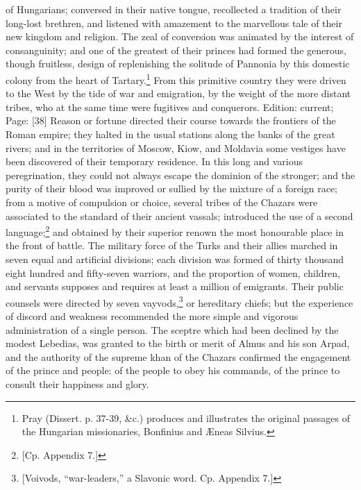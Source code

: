 of Hungarians; conversed in their native tongue, recollected a tradition of their long-lost brethren, and listened with amazement to the marvellous tale of their new kingdom and religion. The zeal of conversion was animated by the interest of consanguinity; and one of the greatest of their princes had formed the generous, though fruitless, design of replenishing the solitude of Pannonia by this domestic colony from the heart of Tartary.\footnote{Pray (Dissert. p. 37-39, \&c.) produces and illustrates the original passages of the Hungarian missionaries, Bonfinius and Æneas Silvius.} From this primitive country they were driven to the West by the tide of war and emigration, by the weight of the more distant tribes, who at the same time were fugitives and conquerors. Edition: current; Page: [38] Reason or fortune directed their course towards the frontiers of the Roman empire; they halted in the usual stations along the banks of the great rivers; and in the territories of Moscow, Kiow, and Moldavia some vestiges have been discovered of their temporary residence. In this long and various peregrination, they could not always escape the dominion of the stronger; and the purity of their blood was improved or sullied by the mixture of a foreign race; from a motive of compulsion or choice, several tribes of the Chazars were associated to the standard of their ancient vassals; introduced the use of a second language;\footnote{[Cp. Appendix 7.]} and obtained by their superior renown the most honourable place in the front of battle. The military force of the Turks and their allies marched in seven equal and artificial divisions; each division was formed of thirty thousand eight hundred and fifty-seven warriors, and the proportion of women, children, and servants supposes and requires at least a million of emigrants. Their public counsels were directed by seven vayvods,\footnote{[Voivods, \texthebrew{“}war-leaders,\texthebrew{}” a Slavonic word. Cp. Appendix 7.]} or hereditary chiefs; but the experience of discord and weakness recommended the more simple and vigorous administration of a single person. The sceptre which had been declined by the modest Lebedias, was granted to the birth or merit of Almus and his son Arpad, and the authority of the supreme khan of the Chazars confirmed the engagement of the prince and people: of the people to obey his commands, of the prince to consult their happiness and glory.

